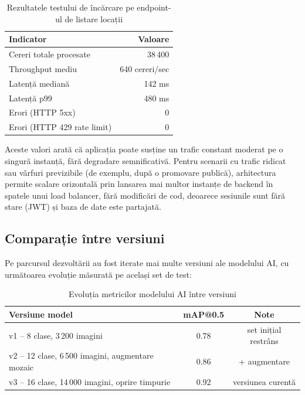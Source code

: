 \begin{table}[H]
\centering
\caption{Rezultatele testului de încărcare pe endpoint-ul de listare locații}
\label{tab:incarcare}
\begin{tabular}{lr}
\hline
\textbf{Indicator} & \textbf{Valoare} \\
\hline
Cereri totale procesate     & 38\,400 \\
Throughput mediu            & 640 cereri/sec \\
Latență mediană             & 142 ms \\
Latență p99                 & 480 ms \\
Erori (HTTP 5xx)            & 0 \\
Erori (HTTP 429 rate limit) & 0 \\
\hline
\end{tabular}
\end{table}

Aceste valori arată că aplicația poate susține un trafic constant moderat pe o singură instanță, fără degradare semnificativă. Pentru scenarii cu trafic ridicat sau vârfuri previzibile (de exemplu, după o promovare publică), arhitectura permite scalare orizontală prin lansarea mai multor instanțe de backend în spatele unui load balancer, fără modificări de cod, deoarece sesiunile sunt fără stare (JWT) și baza de date este partajată.

\subsection{Comparație între versiuni}

Pe parcursul dezvoltării au fost iterate mai multe versiuni ale modelului AI, cu următoarea evoluție măsurată pe același set de test:

\begin{table}[H]
\centering
\caption{Evoluția metricilor modelului AI între versiuni}
\label{tab:evolutie-versiuni}
\begin{tabular}{lcc}
\hline
\textbf{Versiune model} & \textbf{mAP@0.5} & \textbf{Note} \\
\hline
v1 -- 8 clase, 3\,200 imagini & 0.78 & set inițial restrâns \\
v2 -- 12 clase, 6\,500 imagini, augmentare mozaic & 0.86 & + augmentare \\
v3 -- 16 clase, 14\,000 imagini, oprire timpurie & 0.92 & versiunea curentă \\
\hline
\end{tabular}
\end{table}

